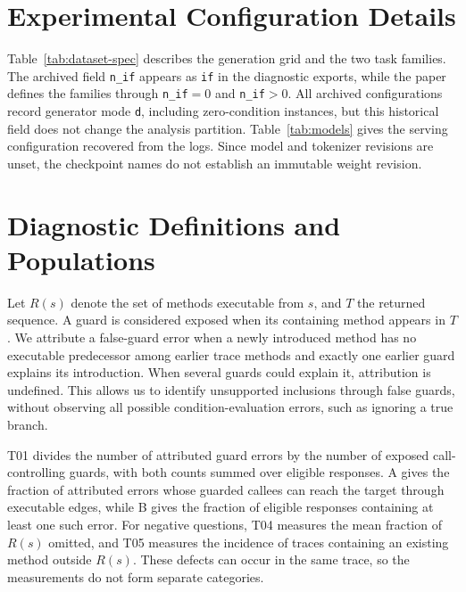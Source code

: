 \section{Experimental Configuration Details}
\label{app:experimental-config}

Table~\ref{tab:dataset-spec} describes the generation grid and the two task families. The archived field \texttt{n\_if} appears as \texttt{if} in the diagnostic exports, while the paper defines the families through \mbox{\texttt{n\_if}$=0$} and \mbox{\texttt{n\_if}$>0$}. All archived configurations record generator mode \texttt{d}, including zero-condition instances, but this historical field does not change the analysis partition. Table~\ref{tab:models} gives the serving configuration recovered from the logs. Since model and tokenizer revisions are unset, the checkpoint names do not establish an immutable weight revision.




\section{Diagnostic Definitions and Populations}
\label{app:diagnostic-definitions}

Let $R(s)$ denote the set of methods executable from $s$, and $T$ the returned sequence. A guard is considered exposed when its containing method appears in $T$. We attribute a false-guard error when a newly introduced method has no executable predecessor among earlier trace methods and exactly one earlier guard explains its introduction. When several guards could explain it, attribution is undefined. This allows us to identify unsupported inclusions through false guards, without observing all possible condition-evaluation errors, such as ignoring a true branch.

\vspace{0.2cm}

T01 divides the number of attributed guard errors by the number of exposed call-controlling guards, with both counts summed over eligible responses. A gives the fraction of attributed errors whose guarded callees can reach the target through executable edges, while B gives the fraction of eligible responses containing at least one such error. For negative questions, T04 measures the mean fraction of $R(s)$ omitted, and T05 measures the incidence of traces containing an existing method outside $R(s)$. These defects can occur in the same trace, so the measurements do not form separate categories.

